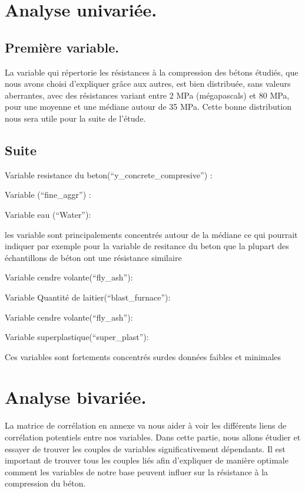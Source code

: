 \documentclass[
  12pt,
]{article}
\begin{document}
\section{Analyse univariée.}\label{analyse-univariuxe9e.}

\subsection{Première variable.}\label{premiuxe8re-variable.}

La variable qui répertorie les résistances à la compression des bétons
étudiés, que nous avons choisi d'expliquer grâce aux autres, est bien
distribuée, sans valeurs aberrantes, avec des résistances variant entre
2 MPa (mégapascals) et 80 MPa, pour une moyenne et une médiane autour de
35 MPa. Cette bonne distribution nous sera utile pour la suite de
l'étude.

\subsection{Suite}\label{suite}

Variable resistance du beton(``y\_concrete\_compresive'') :

Variable (``fine\_aggr'') :

Variable eau (``Water''):

les variable sont principalements concentrés autour de la médiane ce qui
pourrait indiquer par exemple pour la variable de resitance du beton que
la plupart des échantillons de béton ont une résistance similaire

Variable cendre volante(``fly\_ash''):

Variable Quantité de laitier(``blast\_furnace''):

Variable cendre volante(``fly\_ash''):

Variable superplastique(``super\_plast''):

Ces variables sont fortements concentrés surdes données faibles et
minimales

\section{Analyse bivariée.}\label{analyse-bivariuxe9e.}

La matrice de corrélation en annexe va nous aider à voir les différents
liens de corrélation potentiels entre nos variables. Dans cette partie,
nous allons étudier et essayer de trouver les couples de variables
significativement dépendants. Il est important de trouver tous les
couples liés afin d'expliquer de manière optimale comment les variables
de notre base peuvent influer sur la résistance à la compression du
béton.
\end{document}
